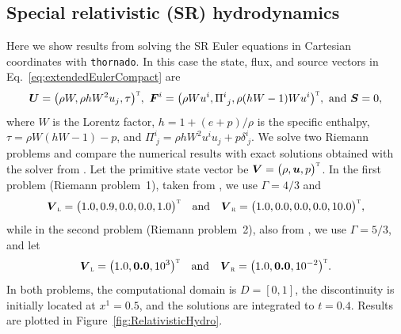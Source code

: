 \documentclass[letterpaper]{jpconf}
\newcommand{\vect}[1]{\boldsymbol{#1}}
\newcommand{\trans}{\textnormal{\tiny\textsc{T}}}
\newcommand{\leftState}{\textnormal{\tiny\textsc{L}}}
\newcommand{\rightState}{\textnormal{\tiny\textsc{R}}}
\newcommand{\thornado}{\texttt{thornado}}
\begin{document}
\subsection{Special relativistic (SR) hydrodynamics}

Here we show results from solving the SR Euler equations in Cartesian coordinates with \thornado.
In this case the state, flux, and source vectors in Eq.~\eqref{eq:extendedEulerCompact} are
\begin{equation}
  \vect{U}=\big(\rho W, \rho h W^{2} u_{j},\tau\big)^{\trans},~
  \vect{F}^{i}=\big(\rho W u^{i},\Pi^{i}_{~j},\rho(hW-1)W u^{i}\big)^{\trans},~
  \text{and}~\vect{S}=0,
\end{equation}
where $W$ is the Lorentz factor, $h=1+(e+p)/\rho$ is the specific enthalpy, $\tau=\rho W(hW-1)-p$, and $\Pi^{i}_{~j}=\rho h W^{2} u^{i} u_{j}+p\delta^{i}_{~j}$.  
We solve two Riemann problems and compare the numerical results with exact solutions obtained with the solver from \cite{martiMuller_2003}.  
Let the primitive state vector be $\vect{V}=\big(\rho,\vect{u},p\big)^{\trans}$.  
In the first problem (Riemann problem~1), taken from \cite{mignoneBodo_2005}, we use $\Gamma=4/3$ and
\begin{equation*}
  \vect{V}_{\leftState}=\big(1.0,0.9,0.0,0.0,1.0\big)^{\trans}\quad\text{and}\quad
  \vect{V}_{\rightState}=\big(1.0,0.0,0.0,0.0,10.0\big)^{\trans},
\end{equation*}
while in the second problem (Riemann problem~2), also from \cite{mignoneBodo_2005}, we use $\Gamma=5/3$, and let
\begin{equation*}
  \vect{V}_{\leftState}=\big(1.0,\vect{0.0},10^{3}\big)^{\trans}\quad\text{and}\quad
  \vect{V}_{\rightState}=\big(1.0,\vect{0.0},10^{-2}\big)^{\trans}.  
\end{equation*}
In both problems, the computational domain is $D=[0,1]$, the discontinuity is initially located at $x^{1}=0.5$, and the solutions are integrated to $t=0.4$.  
Results are plotted in Figure~\ref{fig:RelativisticHydro}.  
\end{document}
